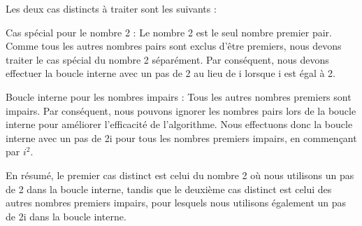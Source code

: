 \documentclass[
]{article}
\begin{document}
Les deux cas distincts à traiter sont les suivants :

Cas spécial pour le nombre 2 : Le nombre 2 est le seul nombre premier
pair. Comme tous les autres nombres pairs sont exclus d'être premiers,
nous devons traiter le cas spécial du nombre 2 séparément. Par
conséquent, nous devons effectuer la boucle interne avec un pas de 2 au
lieu de i lorsque i est égal à 2.

Boucle interne pour les nombres impairs : Tous les autres nombres
premiers sont impairs. Par conséquent, nous pouvons ignorer les nombres
pairs lors de la boucle interne pour améliorer l'efficacité de
l'algorithme. Nous effectuons donc la boucle interne avec un pas de 2i
pour tous les nombres premiers impairs, en commençant par \(i^2\).

En résumé, le premier cas distinct est celui du nombre 2 où nous
utilisons un pas de 2 dans la boucle interne, tandis que le deuxième cas
distinct est celui des autres nombres premiers impairs, pour lesquels
nous utilisons également un pas de 2i dans la boucle interne.
\end{document}
